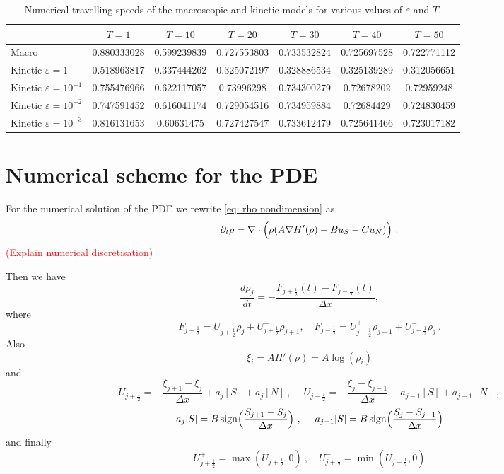\documentclass[11pt,twoside]{article}
\DeclareMathOperator{\sign}{sign}
\begin{document}
\begin{table}[h]
    \centering
    \begin{tabular}{|l|c|c|c|c|c|c|}
        \hline
         & $T=1$ & $T=10$ & $T=20$ & $T=30$ & $T=40$ & $T=50$ \\
        \hline
        Macro & 0.880333028 & 0.599239839 & 0.727553803 & 0.733532824 & 0.725697528 & 0.722771112 \\
        Kinetic $\varepsilon=1$ & 0.518963817 & 0.337444262 & 0.325072197 & 0.328886534 & 0.325139289 & 0.312056651 \\
        Kinetic $\varepsilon=10^{-1}$ & 0.755476966 & 0.622117057 & 0.73996298 & 0.734300279 & 0.72678202 & 0.72959248 \\
        Kinetic $\varepsilon=10^{-2}$ & 0.747591452 & 0.616041174 & 0.729054516 & 0.734959884 & 0.72684429 & 0.724830459 \\
        Kinetic $\varepsilon=10^{-3}$ & 0.816131653 & 0.60631475 & 0.727427547 & 0.733612479 & 0.725641466 & 0.723017182 \\
        \hline
    \end{tabular}
    \caption{Numerical travelling speeds of the macroscopic and kinetic models for various values of $\varepsilon$ and $T$.}
    \label{tab:travel_speed}
\end{table}

\appendix

\section{Numerical scheme for the PDE}
For the numerical solution of the PDE we rewrite \eqref{eq: rho nondimension} as
\begin{equation}
    \partial_t\rho=\nabla\cdot\Bigl(\rho(A\nabla H'(\rho)-Bu_S-Cu_N)\Bigr)\ .
\end{equation}
\textcolor{red}{(Explain numerical discretisation)}

Then we have
\begin{equation}
\frac{d\rho_j}{dt}=-\frac{F_{j+\frac{1}{2}}(t)-F_{j-\frac{1}{2}}(t)}{\Delta x},
\end{equation}
where
\begin{equation}
F_{j+\frac{1}{2}}=U^+_{j+\frac{1}{2}}\rho_j+U^-_{j+\frac{1}{2}}\rho_{j+1}, \quad  F_{j-\frac{1}{2}}=U^+_{j-\frac{1}{2}}\rho_{j-1}+U^-_{j-\frac{1}{2}}\rho_j\ .
\end{equation}
Also
\[
\xi_i=AH'(\rho)=A\log(\rho_i)
\]
and
\begin{equation}
    U_{j+\frac{1}{2}}=-\frac{\xi_{j+1}-\xi_j}{\Delta x}+a_j[S]+a_j[N]\ ,\ \quad    U_{j-\frac{1}{2}}=-\frac{\xi_{j}-\xi_{j-1}}{\Delta x}+a_{j-1}[S]+a_{j-1}[N]\ ,
\end{equation}
\[
a_j[S]=B\sign\Bigl( \frac{S_{j+1}-S_j}{\Delta x}\Bigr)\ ,\ \quad a_{j-1}[S]=B\sign\Bigl( \frac{S_{j}-S_{j-1}}{\Delta x}\Bigr)
\]
and finally
\begin{equation}
    U_{j+\frac{1}{2}}^+=\max(U_{j+\frac{1}{2}},0)\ ,\quad U_{j+\frac{1}{2}}^-=\min(U_{j+\frac{1}{2}},0)
\end{equation}
\end{document}
